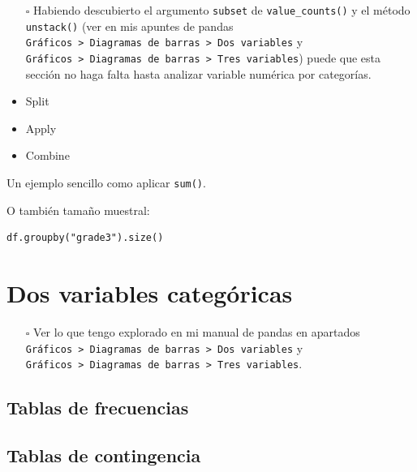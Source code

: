\documentclass[
  a4paper,
  noprof,
  12pt,
  notoc,
  nosols,
  nobib]{mnye}
\providecommand{\tightlist}{%
  \setlength{\itemsep}{0pt}\setlength{\parskip}{0pt}}\usepackage{longtable,booktabs,array}
\theoremstyle{definition}
\theoremstyle{remark}
\begin{document}
\begin{itemize}
\tightlist
\item[$\square$]
  Habiendo descubierto el argumento \texttt{subset} de
  \texttt{value\_counts()} y el método \texttt{unstack()} (ver en mis
  apuntes de pandas
  \texttt{Gráficos\ \textgreater{}\ Diagramas\ de\ barras\ \textgreater{}\ Dos\ variables}
  y
  \texttt{Gráficos\ \textgreater{}\ Diagramas\ de\ barras\ \textgreater{}\ Tres\ variables})
  puede que esta sección no haga falta hasta analizar variable numérica
  por categorías.
\end{itemize}

\begin{itemize}
\tightlist
\item
  Split
\item
  Apply
\item
  Combine
\end{itemize}

Un ejemplo sencillo como aplicar \texttt{sum()}.

O también tamaño muestral:

\begin{verbatim}
df.groupby("grade3").size()
\end{verbatim}


\hypertarget{dos-variables-categuxf3ricas}{%
\section{Dos variables categóricas}\label{dos-variables-categuxf3ricas}}

\begin{itemize}
\tightlist
\item[$\square$]
  Ver lo que tengo explorado en mi manual de pandas en apartados
  \texttt{Gráficos\ \textgreater{}\ Diagramas\ de\ barras\ \textgreater{}\ Dos\ variables}
  y
  \texttt{Gráficos\ \textgreater{}\ Diagramas\ de\ barras\ \textgreater{}\ Tres\ variables}.
\end{itemize}

\hypertarget{tablas-de-frecuencias}{%
\subsection{Tablas de frecuencias}\label{tablas-de-frecuencias}}

\hypertarget{tablas-de-contingencia}{%
\subsection{Tablas de contingencia}\label{tablas-de-contingencia}}
\end{document}
